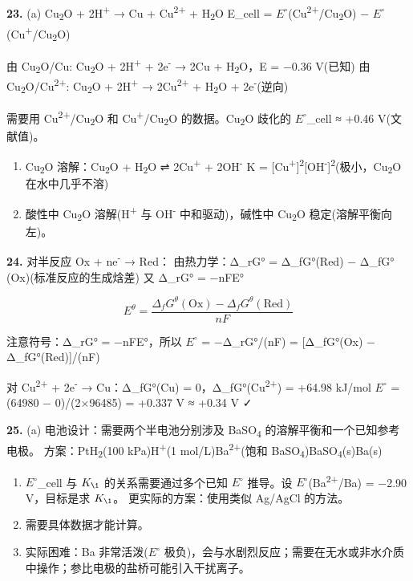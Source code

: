 \textbf{23.}
(a) Cu\textsubscript{2}O + 2H\textsuperscript{+} → Cu + Cu\textsuperscript{2+} + H\textsubscript{2}O
E\_cell = \(E^{\circ}\)(Cu\textsuperscript{2+}/Cu\textsubscript{2}O) − \(E^{\circ}\)(Cu\textsuperscript{+}/Cu\textsubscript{2}O)

由 Cu\textsubscript{2}O/Cu: Cu\textsubscript{2}O + 2H\textsuperscript{+} + 2e\textsuperscript{-} → 2Cu + H\textsubscript{2}O，E = −0.36 V(已知)
由 Cu\textsubscript{2}O/Cu\textsuperscript{2+}: Cu\textsubscript{2}O + 2H\textsuperscript{+} → 2Cu\textsuperscript{2+} + H\textsubscript{2}O + 2e\textsuperscript{-}(逆向)

需要用 Cu\textsuperscript{2+}/Cu\textsubscript{2}O 和 Cu\textsuperscript{+}/Cu\textsubscript{2}O 的数据。Cu\textsubscript{2}O 歧化的 \(E^{\circ}\)\_cell ≈ +0.46 V(文献值)。

\begin{enumerate}
\def\labelenumi{(\alph{enumi})}
\setcounter{enumi}{1}
\item
  Cu\textsubscript{2}O 溶解：Cu\textsubscript{2}O + H\textsubscript{2}O ⇌ 2Cu\textsuperscript{+} + 2OH\textsuperscript{-}
  K = {[}Cu\textsuperscript{+}{]}\textsuperscript{2}{[}OH\textsuperscript{-}{]}\textsuperscript{2}(极小，Cu\textsubscript{2}O 在水中几乎不溶)
\item
  酸性中 Cu\textsubscript{2}O 溶解(H\textsuperscript{+} 与 OH\textsuperscript{-} 中和驱动)，碱性中 Cu\textsubscript{2}O 稳定(溶解平衡向左)。
\end{enumerate}

\textbf{24.} 对半反应 Ox + ne\textsuperscript{-} → Red：
由热力学：Δ\_rG° = Δ\_fG°(Red) − Δ\_fG°(Ox)(标准反应的生成焓差)
又 Δ\_rG° = −nFE°

\[E^\theta = \frac{\Delta_f G^\theta(\mathrm{Ox}) - \Delta_f G^\theta(\mathrm{Red})}{nF}\]

注意符号：Δ\_rG° = −nFE°，所以 \(E^{\circ}\) = −Δ\_rG°/(nF) = {[}Δ\_fG°(Ox) − Δ\_fG°(Red){]}/(nF)

对 Cu\textsuperscript{2+} + 2e\textsuperscript{-} → Cu：Δ\_fG°(Cu) = 0，Δ\_fG°(Cu\textsuperscript{2+}) = +64.98 kJ/mol
\(E^{\circ}\) = (64980 − 0)/(2×96485) = +0.337 V ≈ +0.34 V ✓

\textbf{25.}
(a) 电池设计：需要两个半电池分别涉及 BaSO\textsubscript{4} 的溶解平衡和一个已知参考电极。
方案：Pt\textbar H\textsubscript{2}(100 kPa)\textbar H\textsuperscript{+}(1 mol/L)\textbar\textbar Ba\textsuperscript{2+}(饱和 BaSO\textsubscript{4})\textbar BaSO\textsubscript{4}(s)\textbar Ba(s)

\begin{enumerate}
\def\labelenumi{(\alph{enumi})}
\setcounter{enumi}{1}
\item
  \(E^{\circ}\)\_cell 与 \(K_{\1}\) 的关系需要通过多个已知 \(E^{\circ}\) 推导。设 \(E^{\circ}\)(Ba\textsuperscript{2+}/Ba) = −2.90 V，目标是求 \(K_{\1}\)。
  更实际的方案：使用类似 Ag/AgCl 的方法。
\item
  需要具体数据才能计算。
\item
  实际困难：Ba 非常活泼(\(E^{\circ}\) 极负)，会与水剧烈反应；需要在无水或非水介质中操作；参比电极的盐桥可能引入干扰离子。
\end{enumerate}
